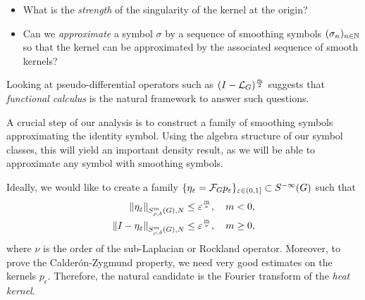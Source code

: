 \begin{itemize}
    \item What is the \emph{strength} of the singularity of the kernel at the origin?
    \item Can we \emph{approximate} a symbol $\sigma$ by a sequence of smoothing symbols $(\sigma_n)_{n \in \mathbb{N}}$ so that the kernel can be approximated by the associated sequence of smooth kernels?
\end{itemize}

Looking at pseudo-differential operators such as $(I - {\mathcal{L}_{G}})^\frac{m}{2}$
suggests that \emph{functional calculus} is the natural framework to answer such questions.

A crucial step of our analysis is to construct a family of smoothing symbols approximating the identity symbol.
Using the algebra structure of our symbol classes,
this will yield an important density result,
as we will be able to approximate any symbol with smoothing symbols.

Ideally,
we would like to create a family $\{\eta_\varepsilon = \mathcal{F}_{G} p_\varepsilon\}_{\varepsilon \in (0, 1]} \subset {S^{-\infty} (G)}$
such that
\begin{align}
    \SymbolSemiNorm m {\rho, \delta} N {\eta_\epsilon}
    &\leq \epsilon^\frac m \nu,
    \quad m < 0,
    \label{eq:survey:density_estimate:1}
    \\
    \SymbolSemiNorm m {\rho, \delta} N {\Id {} - \eta_\epsilon}
    &\leq \epsilon^\frac m \nu,
    \quad m \geq 0,
    \label{eq:survey:density_estimate:2}
\end{align}
where $\nu$ is the order of the sub-Laplacian or Rockland operator.
Moreover,
to prove the Calder\'on-Zygmund property,
we need very good estimates on the kernels $p_\epsilon$.
Therefore, the natural candidate is the Fourier transform of the \emph{heat kernel}.

